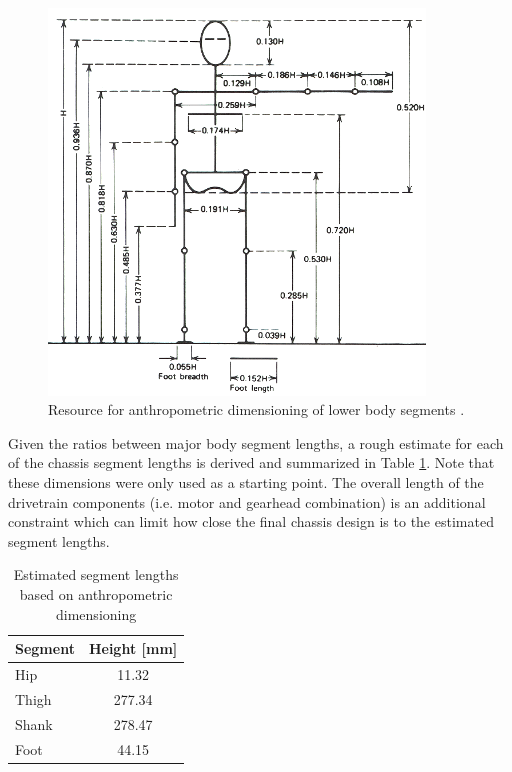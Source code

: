 \begin{figure}[!h]
	\begin{center}
    \includegraphics[width=100mm]{fig/design/anthropo.png}
	\end{center}
  \caption{Resource for anthropometric dimensioning of lower body segments \cite{wintergait}.}
\label{fig:anthropo}
\end{figure}
	
Given the ratios between major body segment lengths, a rough estimate for each of the chassis segment lengths is derived and summarized in Table \ref{tab:anthropo}. Note that these dimensions were only used as a starting point. The overall length of the drivetrain components (i.e. motor and gearhead combination) is an additional constraint which can limit how close the final chassis design is to the estimated segment lengths.  

\begin{table}[!h]
  \centering
  \caption{Estimated segment lengths based on anthropometric dimensioning}
  \label{tab:anthropo}%
    \begin{tabular}{lc}
    \addlinespace
    \toprule
    \textbf{Segment} & \textbf{Height [mm]} \\
    \midrule
    Hip   & 11.32 \\
    Thigh & 277.34 \\
    Shank & 278.47 \\
    Foot  & 44.15 \\
    \bottomrule
    \end{tabular}%
\end{table}

